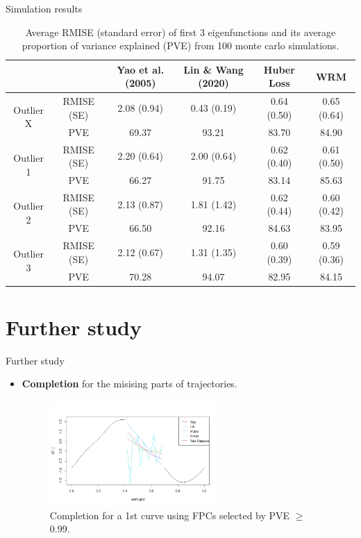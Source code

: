 \documentclass[9pt]{beamer}
\begin{document}
\begin{frame}[allowframebreaks]{Simulation results}
 
     \pagebreak
	 \vspace*{0pt}
	 \begin{table}[ht]
	 	\footnotesize
	 	\centering
	 	\tabcolsep=4.5pt
	 	\begin{tabular}{cccccc}
	 		\hline\hline
	 		& & Yao et al. (2005) & Lin \& Wang (2020) & Huber Loss & WRM \\ 
	 		\hline
	 		\multirow{2}{*}{Outlier X} & RMISE (SE) & 2.08 (0.94) & 0.43 (0.19) & 0.64 (0.50) & 0.65 (0.64) \\ 
	 								   & PVE & 69.37 & 93.21 & 83.70 & 84.90 \\ 
	 		\hline
	 		\multirow{2}{*}{Outlier 1} & RMISE (SE) & 2.20 (0.64) & 2.00 (0.64) & 0.62 (0.40) & 0.61 (0.50) \\ 
							 		   & PVE & 66.27 & 91.75 & 83.14 & 85.63 \\ 
	 		\hline
	 		\multirow{2}{*}{Outlier 2} & RMISE (SE) & 2.13 (0.87) & 1.81 (1.42) & 0.62 (0.44) & 0.60 (0.42) \\ 
	 								   & PVE & 66.50 & 92.16 & 84.63 & 83.95 \\ 
	 		\hline
	 		\multirow{2}{*}{Outlier 3} & RMISE (SE) & 2.12 (0.67) & 1.31 (1.35) & 0.60 (0.39) & 0.59 (0.36) \\ 
	 								   & PVE & 70.28 & 94.07 & 82.95 & 84.15 \\ 
	 		\hline\hline
	 	\end{tabular}
	 	\caption{Average RMISE (standard error) of first 3 eigenfunctions and its average proportion of variance explained (PVE) from 100 monte carlo simulations.}\label{t3}
	 \end{table}
\end{frame}




\section{Further study}

\begin{frame}[allowframebreaks]{Further study}
	\begin{itemize}
    	\item{
			\textbf{Completion} for the misising parts of trajectories.
			\begin{figure}[h]
				\centering
				\includegraphics[height=4cm,keepaspectratio=true]{../../figure/comp1.png}
				\caption{Completion for a 1st curve using FPCs selected by PVE $\ge$ 0.99.}
			\end{figure}
		}
	\end{itemize}
\end{frame}
\end{document}
